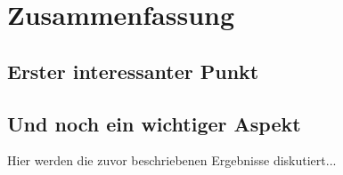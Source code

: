 \section{Zusammenfassung}

\subsection{Erster interessanter Punkt}

\subsection{Und noch ein wichtiger Aspekt}

Hier werden die zuvor beschriebenen Ergebnisse diskutiert...